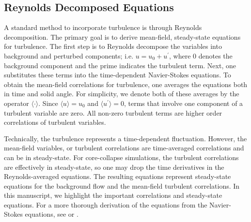 \documentclass[twocolumn]{aastex6}
\begin{document}
\subsection{Reynolds Decomposed Equations}
\label{RD}


A standard method to incorporate turbulence is through Reynolds
decomposition. The primary goal is to derive mean-field,
  steady-state equations for turbulence.  The
  first step is to Reynolds decompose the variables into background
  and perturbed components; i.e. $u = u_0 + u^{\prime}$,
    where $0$ denotes the background component and the prime indicates
    the turbulent term.  Next, one substitutes these terms
	  into the time-dependent Navier-Stokes equations.  To
	  obtain the mean-field correlations for turbulence, one averages the equations both
  in time and solid angle. For simplicity,
	we denote both of these averages by the operator $\langle \cdot
  \rangle$.  Since $\langle u \rangle = u_0$ and $\langle
  u^{\prime} \rangle = 0$, terms that involve one component of a
  turbulent variable are zero.  All non-zero turbulent terms are higher
order correlations of turbulent variables.  

Technically, the turbulence represents a
	time-dependent fluctuation.  However, the mean-field variables, or
  turbulent correlations are time-averaged correlations and can be in
  steady-state.  For core-collapse simulations, the turbulent
  correlations are effectively in steady-state, so one may drop the
  time derivatives in the Reynolds-averaged equations.  The resulting
  equations represent steady-state equations for the background flow
  and the mean-field turbulent correlations.  In this manuscript, we
  highlight the important correlations and steady-state equations.
  For a more thorough derivation of the equations from the
  Navier-Stokes equations, see \citet{meakin07b} or \citet{murphy11b}.
\end{document}
